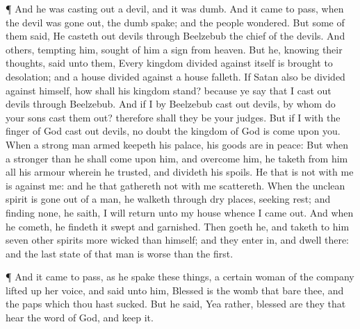  ¶ And he was casting out a devil, and it was dumb. And it
came to pass, when the devil was gone out, the dumb spake; and the
people wondered.  But some of them said, He casteth out
devils through Beelzebub the chief of the devils.  And
others, tempting him, sought of him a sign from heaven. 
But he, knowing their thoughts, said unto them, Every kingdom divided
against itself is brought to desolation; and a house divided against a
house falleth.  If Satan also be divided against himself,
how shall his kingdom stand? because ye say that I cast out devils
through Beelzebub.  And if I by Beelzebub cast out devils,
by whom do your sons cast them out? therefore shall they be your judges.
 But if I with the finger of God cast out devils, no doubt
the kingdom of God is come upon you.  When a strong man
armed keepeth his palace, his goods are in peace:  But when
a stronger than he shall come upon him, and overcome him, he taketh from
him all his armour wherein he trusted, and divideth his spoils.
 He that is not with me is against me: and he that
gathereth not with me scattereth.  When the unclean spirit
is gone out of a man, he walketh through dry places, seeking rest; and
finding none, he saith, I will return unto my house whence I came out.
 And when he cometh, he findeth it swept and garnished.
 Then goeth he, and taketh to him seven other spirits more
wicked than himself; and they enter in, and dwell there: and the last
state of that man is worse than the first.

 ¶ And it came to pass, as he spake these things, a certain
woman of the company lifted up her voice, and said unto him, Blessed is
the womb that bare thee, and the paps which thou hast sucked.
 But he said, Yea rather, blessed are they that hear the
word of God, and keep it.

